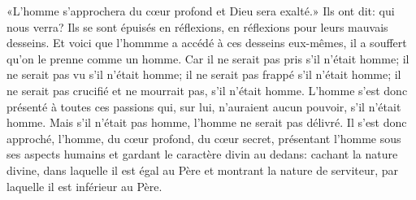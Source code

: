 «L’homme s’approchera du cœur profond et Dieu sera exalté.»
Ils ont dit: qui nous verra?
Ils se sont épuisés en réflexions, en réflexions pour leurs mauvais desseins.
Et voici que l’hommme a accédé à ces desseins eux-mêmes,
	il a souffert qu’on le prenne comme un homme.
Car il ne serait pas pris s’il n’était homme;
	il ne serait pas vu s’il n’était homme;
	il ne serait pas frappé s’il n’était homme;
	il ne serait pas crucifié et ne mourrait pas, s’il n’était homme.
L’homme s’est donc présenté à toutes ces passions
	qui, sur lui, n’auraient aucun pouvoir, s’il n’était homme.
Mais s’il n’était pas homme, l’homme ne serait pas délivré.
Il s’est donc approché, l’homme, du cœur profond, du cœur secret,
	présentant l’homme sous ses aspects humains
	et gardant le caractère divin au dedans:
	cachant la nature divine, dans laquelle il est égal au Père
	et montrant la nature de serviteur, par laquelle il est inférieur au Père.
